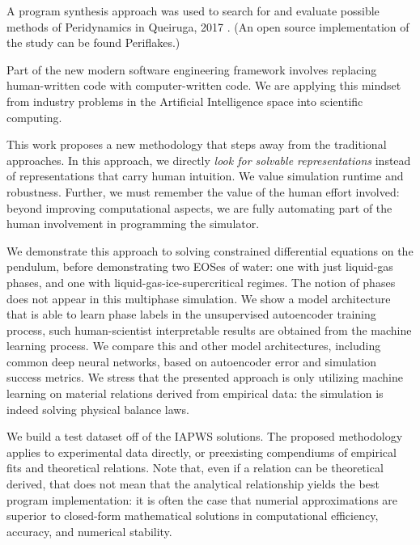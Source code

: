 \documentclass[]{article}
\begin{document}
\cite{wu_physics-informed_2018}
\cite{xie_tempogan:_2018}

 A program synthesis approach was used to search for and evaluate possible methods of Peridynamics in Queiruga, 2017 \cite{queiruga2017numerical}. (An open source implementation of the study can be found Periflakes\cite{queiruga2018periflakes}.)

Part of the new modern software engineering framework involves replacing
human-written code with computer-written code. We are applying this
mindset from industry problems in the Artificial
Intelligence space into scientific computing.


This work proposes a new methodology that steps away from the
traditional approaches. 
In this approach, we directly \emph{look for solvable representations}
instead of representations that carry human intuition. We value
simulation runtime and robustness. Further, we must remember the value
of the human effort involved: beyond improving computational aspects,
we are fully automating part of the human involvement in programming
the simulator.




We demonstrate this approach to solving constrained differential
equations on the pendulum, before demonstrating two EOSes of water: one
with just liquid-gas phases, and one with liquid-gas-ice-supercritical
regimes. The notion of phases does not appear in this multiphase
simulation. We show a model architecture that is able to learn phase
labels in the unsupervised autoencoder training process, such
human-scientist interpretable results are obtained from the machine
learning process. We compare this and other model architectures,
including common deep neural networks, based on autoencoder error and
simulation success metrics. We stress that the presented approach is
only utilizing machine learning on material relations derived from
empirical data: the simulation is indeed solving physical balance laws.

We build a test dataset off of the IAPWS solutions. The proposed
methodology applies to experimental data directly, or preexisting
compendiums of empirical fits and theoretical relations.
Note that, even if a relation can be theoretical derived, that does
not mean that the analytical relationship yields the best program
implementation: it is often the case that numerial approximations are
superior to closed-form mathematical solutions in computational
efficiency, accuracy, and numerical stability.
\end{document}
